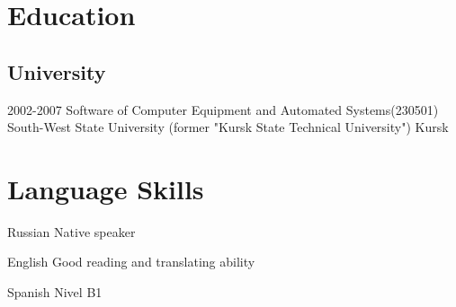 \documentclass[11pt,a4paper,sans]{moderncv}
\newcommand{\lang}[2]{#2}
\begin{document}
\section
    {\lang
        {Образование}
        {Education}}

\subsection
    {\lang
        {Высшее образование}
        {University}}

\cventry
    {2002-2007}
    {\lang
        {Инженер по специальности «Программное обеспечение вычислительной техники и автоматизированных систем»}
        {Software of Computer Equipment and Automated Systems(230501)}}
    {\lang
        {«Юго-Западный государственный университет» (бывший «Курский государственный технический университет»)}
        {South-West State University (former "Kursk State Technical University")}}
    {\lang
        {Курск}
        {Kursk}}
    {}
    {}

\section
    {\lang
        {Языки}
        {Language Skills}}

\cvlanguage
    {\lang
        {Русский}
        {Russian}}
    {\lang
        {родной язык}
        {Native speaker}}
    {}

\cvlanguage
    {\lang
        {Английский}
        {English}}
    {\lang
        {технический, разговорный}
        {Good reading and translating ability}}
    {}

\cvlanguage
    {\lang
        {Испанский}
        {Spanish}}
    {\lang
        {уровень B1}
        {Nivel B1}}
    {}
\end{document}
